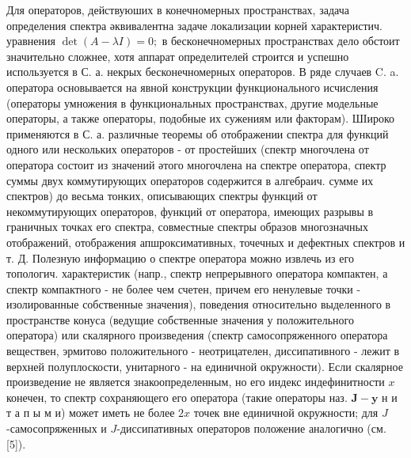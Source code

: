 \documentclass[10pt]{article}
\begin{document}
Для операторов, действуюших в конечномерных пространствах, задача определения спектра әквивалентна задаче локализации корней характеристич. уравнения $\operatorname{det}(A-\lambda I)=0 ;$ в бесконечномерных пространствах дело обстоит значительно сложнее, хотя аппарат определителей строится и успешно используется в С. а. некрых бесконечномерных операторов. В ряде случаев C. a. оператора основывается на явной конструкции функционального исчисления (операторы умножения в функциональных пространствах, другие модельные операторы, а также операторы, подобные их сужениям или факторам). ШІироко применяются в С. а. различные теоремы об отображении спектра для функций одного или нескольких операторов - от простейших (спектр многочлена от оператора состоит из значений әтого многочлена на спектре оператора, спектр суммы двух коммутирующих операторов содержится в алгебраич. сумме их спектров) до весьма тонких, описывающих спектры функций от некоммутирующих операторов, функций от оператора, имеющих разрывы в граничных точках его спектра, совместные спектры образов многозначных отображений, отображения апшроксимативных, точечных и дефектных спектров и т. Д. Полезную информацию о спектре оператора можно извлечь из его топологич. характеристик (напр., спектр непрерывного оператора компактен, а спектр компактного - не более чем счетен, причем его ненулевые точки - изолированные собственные значения), поведения относительно выделенного в пространстве конуса (ведущие собственные значения у положительного оператора) или скалярного произведения (спектр самосопряженного оператора веществен, эрмитово положительного - неотрицателен, диссипативного - лежит в верхней полуплоскости, унитарного - на единичной окружности). Если скалярное произведение не является знакоопределенным, но его индекс индефинитности $x$ конечен, то спектр сохраняющего его оператора (такие операторы наз. $\boldsymbol{J}-\mathbf{y}$ н и т а п ы м и) может иметь не более $2 x$ точек вне единичной окружности; для $J$-самосопряженных и $J$-диссипативных операторов положение аналогично (см. [5]).
\end{document}
